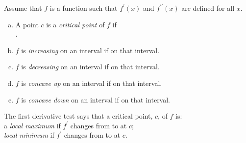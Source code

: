 \documentclass[12pt]{amsart}
\begin{document}
\begin{thm}[5 Points]
  Assume that $f$ is a function such that $f^\prime(x)$ and $f^{\prime\prime}(x)$ are defined for all $x$.
  \begin{enumerate}[(a)]
  \item
    A point \(c\) is a \textit{critical point} of \(f\) if \vspace{.15in}\\
    {\underline{\hspace{4in}}}.
    \vspace{.15in}
  \item
    $f$ is \textit{increasing} on an interval if {\underline{\hspace{1.5in}}} on that interval.
    \vspace{.15in}
  \item
    $f$ is \textit{decreasing} on an interval if {\underline{\hspace{1.5in}}} on that interval.
    \vspace{.15in}
  \item
    $f$ is \textit{concave up} on an interval if {\underline{\hspace{1.5in}}} on that interval.
    \vspace{.15in}
  \item
    $f$ is \textit{concave down} on an interval if {\underline{\hspace{1.5in}}} on that interval.
    \vspace{.15in}
  \end{enumerate}
\end{thm}

\begin{thm}[4 Points]
  The first derivative test says that a critical point, $c$, of $f$ is: \vspace{.15in}\\
  a \textit{local maximum} if $f^\prime$ changes from {\underline{\hspace{1.5in}}} to {\underline{\hspace{1.5in}}} at $c$;    \vspace{.15in}\\
  \textit{local minimum} if $f^\prime$ changes from {\underline{\hspace{1.5in}}} to {\underline{\hspace{1.5in}}} at $c$.
\end{thm}
\end{document}
